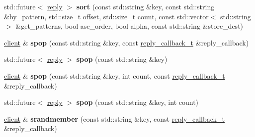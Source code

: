 \begin{DoxyCompactItemize}
\item 
\mbox{\label{classcpp__redis_1_1client_aef109c8efe63525747ecb34994e6c318}} 
std\+::future$<$ \hyperlink{classcpp__redis_1_1reply}{reply} $>$ {\bfseries sort} (const std\+::string \&key, const std\+::string \&by\+\_\+pattern, std\+::size\+\_\+t offset, std\+::size\+\_\+t count, const std\+::vector$<$ std\+::string $>$ \&get\+\_\+patterns, bool asc\+\_\+order, bool alpha, const std\+::string \&store\+\_\+dest)
\item 
\mbox{\label{classcpp__redis_1_1client_a9a59ca9396d1447ae3a8bb584449e174}} 
\hyperlink{classcpp__redis_1_1client}{client} \& {\bfseries spop} (const std\+::string \&key, const \hyperlink{classcpp__redis_1_1client_a061a1140d36d2eaeda82b09a0bb3f9f2}{reply\+\_\+callback\+\_\+t} \&reply\+\_\+callback)
\item 
\mbox{\label{classcpp__redis_1_1client_aabd8e3ddf02299eb129af8ad27555282}} 
std\+::future$<$ \hyperlink{classcpp__redis_1_1reply}{reply} $>$ {\bfseries spop} (const std\+::string \&key)
\item 
\mbox{\label{classcpp__redis_1_1client_a75a34f373c405999036a1e7e476ff201}} 
\hyperlink{classcpp__redis_1_1client}{client} \& {\bfseries spop} (const std\+::string \&key, int count, const \hyperlink{classcpp__redis_1_1client_a061a1140d36d2eaeda82b09a0bb3f9f2}{reply\+\_\+callback\+\_\+t} \&reply\+\_\+callback)
\item 
\mbox{\label{classcpp__redis_1_1client_acde89afde549cbe7ead5453fd3635081}} 
std\+::future$<$ \hyperlink{classcpp__redis_1_1reply}{reply} $>$ {\bfseries spop} (const std\+::string \&key, int count)
\item 
\mbox{\label{classcpp__redis_1_1client_a69e771fb9562fca08cbf653f8ecb295b}} 
\hyperlink{classcpp__redis_1_1client}{client} \& {\bfseries srandmember} (const std\+::string \&key, const \hyperlink{classcpp__redis_1_1client_a061a1140d36d2eaeda82b09a0bb3f9f2}{reply\+\_\+callback\+\_\+t} \&reply\+\_\+callback)
\item 
\mbox{\label{classcpp__redis_1_1client_a2a110009cac1bb5063d468df91802395}} 

\end{DoxyCompactItemize}
